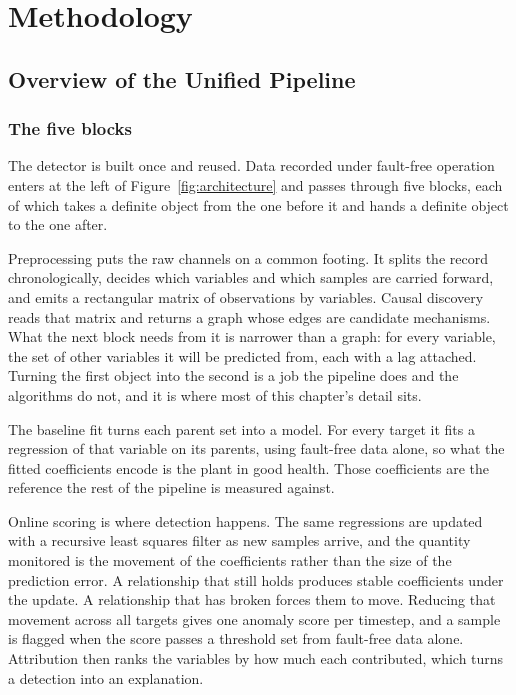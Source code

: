 \chapter{Methodology}
\label{ch:methodology}

\section{Overview of the Unified Pipeline}
\label{sec:method-overview}

\subsection{The five blocks}

The detector is built once and reused. Data recorded under fault-free operation enters at the left of Figure~\ref{fig:architecture} and passes through five blocks, each of which takes a definite object from the one before it and hands a definite object to the one after.

Preprocessing puts the raw channels on a common footing. It splits the record chronologically, decides which variables and which samples are carried forward, and emits a rectangular matrix of observations by variables. Causal discovery reads that matrix and returns a graph whose edges are candidate mechanisms. What the next block needs from it is narrower than a graph: for every variable, the set of other variables it will be predicted from, each with a lag attached. Turning the first object into the second is a job the pipeline does and the algorithms do not, and it is where most of this chapter's detail sits.

The baseline fit turns each parent set into a model. For every target it fits a regression of that variable on its parents, using fault-free data alone, so what the fitted coefficients encode is the plant in good health. Those coefficients are the reference the rest of the pipeline is measured against.

Online scoring is where detection happens. The same regressions are updated with a recursive least squares filter as new samples arrive, and the quantity monitored is the movement of the coefficients rather than the size of the prediction error. A relationship that still holds produces stable coefficients under the update. A relationship that has broken forces them to move. Reducing that movement across all targets gives one anomaly score per timestep, and a sample is flagged when the score passes a threshold set from fault-free data alone. Attribution then ranks the variables by how much each contributed, which turns a detection into an
explanation.


